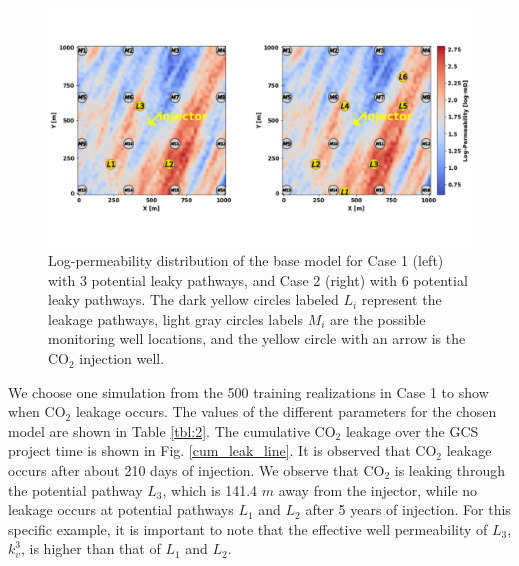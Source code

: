 \documentclass[a4paper,fleqn]{cas-sc}
\begin{document}
\begin{figure}
    \centering
    \includegraphics[width=15cm]{figs/Figure 7.pdf}
    \caption{Log-permeability distribution of the base model for Case 1 (left) with 3 potential leaky pathways, and Case 2 (right) with 6 potential leaky pathways. The dark yellow circles labeled $L_i$ represent the leakage pathways, light gray circles labels $M_i$ are the possible monitoring well locations, and the yellow circle with an arrow is the CO$_2$ injection well.}
    \label{cases}
\end{figure}

We choose one simulation from the 500 training realizations in Case 1 to show when CO$_2$ leakage occurs. The values of the different parameters for the chosen model are shown in Table \ref{tbl:2}. The cumulative CO$_2$ leakage over the GCS project time is shown in Fig. \ref{cum_leak_line}. It is observed that CO$_2$ leakage occurs after about 210 days of injection. We observe that CO$_2$ is leaking through the potential pathway $L_3$, which is 141.4 $m$ away from the injector, while no leakage occurs at potential pathways $L_1$ and $L_2$ after 5 years of injection. For this specific example, it is important to note that the effective well permeability of $L_3$, $k_v^3$, is higher than that of $L_1$ and $L_2$.
\end{document}
